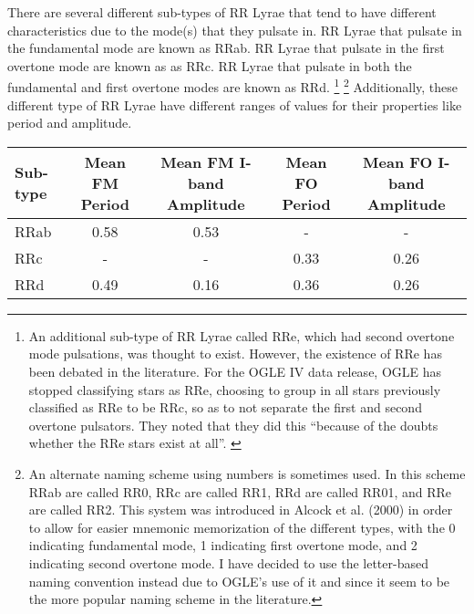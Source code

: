 \documentclass[]{article}
\begin{document}
There are several different sub-types of RR Lyrae that tend to have different characteristics due to the mode(s) that they pulsate in. \cite{chen_2013} RR Lyrae that pulsate in the fundamental mode are known as RRab. RR Lyrae that pulsate in the first overtone mode are known as as RRc. RR Lyrae that pulsate in both the fundamental and first overtone modes are known as RRd. \footnote{An additional sub-type of RR Lyrae called RRe, which had second overtone mode pulsations, was thought to exist. However, the existence of RRe has been debated in the literature. \cite{chen_2013} For the OGLE IV data release, OGLE has stopped classifying stars as RRe, choosing to group in all stars previously classified as RRe to be RRc, so as to not separate the first and second overtone pulsators. They noted that they did this ``because of the doubts whether the RRe stars exist at all''. \cite{soszynski_2016}} \footnote{An alternate naming scheme using numbers is sometimes used. In this scheme RRab are called RR0, RRc are called RR1, RRd are called RR01, and RRe are called RR2. This system was introduced in Alcock et al. (2000) in order to allow for easier mnemonic memorization of the different types, with the 0 indicating fundamental mode, 1 indicating first overtone mode, and 2 indicating second overtone mode. \cite{chen_2013} I have decided to use the letter-based naming convention instead due to OGLE's use of it and since it seem to be the more popular naming scheme in the literature.} \cite{chen_2013} Additionally, these different type of RR Lyrae have different ranges of values for their properties like period and amplitude.


\begin{center}
\begin{tabular}{|l|c|c|c|c|}
	\hline
	Sub-type & Mean FM Period & Mean FM I-band Amplitude & Mean FO Period & Mean FO I-band Amplitude \\
	\hline
	RRab & 0.58 & 0.53 & - & - \\
	RRc & - & - & 0.33 & 0.26 \\
	RRd & 0.49 & 0.16 & 0.36 & 0.26 \\
	\hline
\end{tabular}
\end{center}
\end{document}
